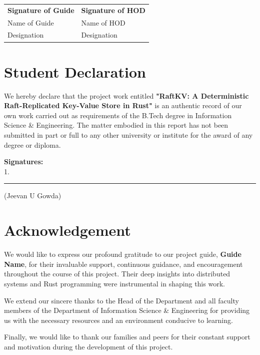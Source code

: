 \documentclass[12pt,a4paper]{report}
\begin{document}
\vspace{2cm}
\noindent
\begin{tabular}{@{}p{}p{}@{}}
\textbf{Signature of Guide} & \textbf{Signature of HOD} \\
Name of Guide & Name of HOD \\
Designation & Designation \\
\end{tabular}

\newpage
\chapter*{Student Declaration}
We hereby declare that the project work entitled \textbf{"RaftKV: A Deterministic Raft-Replicated Key-Value Store in Rust"} is an authentic record of our own work carried out as requirements of the B.Tech degree in Information Science \& Engineering. The matter embodied in this report has not been submitted in part or full to any other university or institute for the award of any degree or diploma.

\vspace{2cm}
\noindent
\textbf{Signatures:}\\
1. \rule{4cm}{0.4pt} \quad (Jeevan U Gowda)

\newpage

\chapter*{Acknowledgement}

We would like to express our profound gratitude to our project guide, \textbf{Guide Name}, for their invaluable support, continuous guidance, and encouragement throughout the course of this project. Their deep insights into distributed systems and Rust programming were instrumental in shaping this work.

We extend our sincere thanks to the Head of the Department and all faculty members of the Department of Information Science \& Engineering for providing us with the necessary resources and an environment conducive to learning.

Finally, we would like to thank our families and peers for their constant support and motivation during the development of this project.
\end{document}
